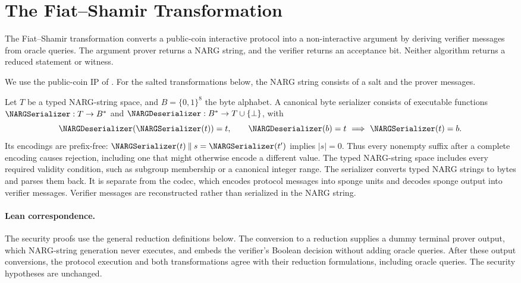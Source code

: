 \section{The Fiat--Shamir Transformation}\label{sec:fiat_shamir}

The Fiat--Shamir transformation converts a public-coin interactive protocol into a non-interactive argument by deriving verifier messages from oracle queries. The argument prover returns a NARG string, and the verifier returns an acceptance bit. Neither algorithm returns a reduced statement or witness.

We use the public-coin IP of . For the salted transformations below, the NARG string consists of a salt and the prover messages.

\begin{definition}
\label{def:narg_serializer}
\leanok
Let \(T\) be a typed NARG-string space, and \(B=\{0,1\}^8\) the byte alphabet. A canonical byte serializer consists of executable functions \(\NARGSerializer:T\to B^*\) and \(\NARGDeserializer:B^*\to T\cup\{\bot\}\), with
\begin{equation*}
\NARGDeserializer(\NARGSerializer(t))=t,\qquad
\NARGDeserializer(b)=t\ \Longrightarrow\ \NARGSerializer(t)=b.
\end{equation*}
Its encodings are prefix-free: \(\NARGSerializer(t)\mathbin\Vert s=\NARGSerializer(t')\) implies \(|s|=0\). Thus every nonempty suffix after a complete encoding causes rejection, including one that might otherwise encode a different value. The typed NARG-string space includes every required validity condition, such as subgroup membership or a canonical integer range. The serializer converts typed NARG strings to bytes and parses them back. It is separate from the codec, which encodes protocol messages into sponge units and decodes sponge output into verifier messages. Verifier messages are reconstructed rather than serialized in the NARG string.

\end{definition}

\paragraph{Lean correspondence.}
The security proofs use the general reduction definitions below. The conversion to a reduction supplies a dummy terminal prover output, which NARG-string generation never executes, and embeds the verifier's Boolean decision without adding oracle queries. After these output conversions, the protocol execution and both transformations agree with their reduction formulations, including oracle queries. The security hypotheses are unchanged.

